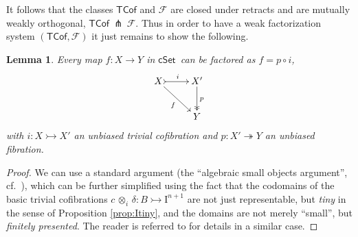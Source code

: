 \documentclass[11pt]{amsart}
\newcommand{\cSet}{\ensuremath{\mathsf{cSet}}}
\newcommand{\mono}{\ensuremath{\rightarrowtail}}
\newcommand{\ra}{\ensuremath{\rightarrow}}
\newcommand{\onto}{\ensuremath{\twoheadrightarrow}}
\newcommand{\I}{\ensuremath{\mathrm{I}}}
\newtheorem{lemma}[theorem]{Lemma}
\theoremstyle{remark}
\theoremstyle{definition}
\begin{document}
It follows that the classes $\mathsf{TCof}$ and $\mathcal{F}$ are closed under retracts and are mutually weakly orthogonal, $\mathsf{TCof}\ {\pitchfork}\ \mathcal{F}$.
Thus in order to have a weak factorization system $(\mathsf{TCof}, \mathcal{F})$ it just remains to show the following.

\begin{lemma}\label{lemma:factorization}
Every map $f: X\ra Y$ in \cSet\ can be factored as $f  = p\circ i$,
\begin{equation}%
\xymatrix{
X \ar[rd]_{f} \ar@{>->}[r]^i & X'\ar@{->>}[d]^p\\
& Y
}
\end{equation}
with $i: X\mono X'$ an unbiased trivial cofibration and $p: X'\onto Y$ an unbiased fibration.
\end{lemma}
%
\begin{proof}
We can use a standard argument (the ``algebraic small objects argument'', cf.~\cite{Garner}), which can be further simplified using the fact that the codomains of the basic trivial cofibrations $c\, \otimes_i \,\delta : B \mono \I^{n+1}$ are not just representable, but \emph{tiny} in the sense of Proposition \ref{prop:Itiny}, and the domains are not merely ``small'', but \emph{finitely presented}.  The reader is referred to \cite{A:cubical} for details in a similar case.
\end{proof}
%
\end{document}
